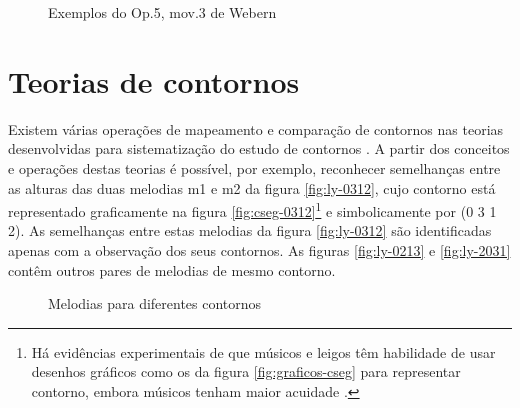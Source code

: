\begin{figure}
  \centering

  \quad
  \caption{Exemplos do Op.5, mov.3 de Webern}
  \label{fig:exemplos-webern}
\end{figure}

\section{Teorias de contornos}
\label{sec:teor-de-cont}

Existem várias operações de mapeamento e comparação de contornos nas
teorias desenvolvidas para sistematização do estudo de contornos
\cite{friedmann85:methodology,friedmann87:response,morris87:composition,morris93:directions,marvin.ea87:relating,clifford95:contour,polansky.ea92:possible,quinn97:fuzzy,beard03:contour}.
A partir dos conceitos e operações destas teorias é possível, por
exemplo, reconhecer semelhanças entre as alturas das duas melodias m1
e m2 da figura \ref{fig:ly-0312}, cujo contorno está representado
graficamente na figura \ref{fig:cseg-0312}\footnote{Há evidências
  experimentais de que músicos e leigos têm habilidade de usar
  desenhos gráficos como os da figura \ref{fig:graficos-cseg} para
  representar contorno, embora músicos tenham maior acuidade
  \cite[p. 69]{marvin88:generalized}.} e simbolicamente por (0 3 1 2).
As semelhanças entre estas melodias da figura \ref{fig:ly-0312} são
identificadas apenas com a observação dos seus contornos. As figuras
\ref{fig:ly-0213} e \ref{fig:ly-2031} contêm outros pares de melodias
de mesmo contorno.

\begin{figure}
  \centering
  \quad

  \caption{Melodias para diferentes contornos}
  \label{fig:melodias-cseg}
\end{figure}

